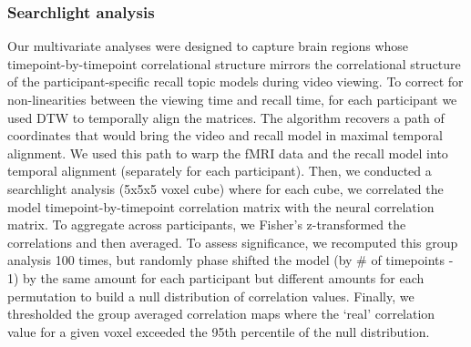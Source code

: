 \documentclass{article}
\begin{document}
{ \subsubsection{Searchlight analysis}
 Our multivariate analyses were designed to capture brain regions whose timepoint-by-timepoint correlational structure mirrors the correlational structure of the participant-specific recall topic models during video viewing. To correct for non-linearities between the viewing time and recall time, for each participant we used DTW to temporally align the matrices. The algorithm recovers a path of coordinates that would bring the video and recall model in maximal temporal alignment. We used this path to warp the fMRI data and the recall model into temporal alignment (separately for each participant). Then, we conducted a searchlight analysis (5x5x5 voxel cube) where for each cube, we correlated the model timepoint-by-timepoint correlation matrix with the neural correlation matrix. To aggregate across participants, we Fisher's z-transformed the correlations and then averaged.  To assess significance, we recomputed this group analysis 100 times, but randomly phase shifted the model (by \# of timepoints - 1) by the same amount for each participant but different amounts for each permutation to build a null distribution of correlation values. Finally, we thresholded the group averaged correlation maps where the `real' correlation value for a given voxel exceeded the 95th percentile of the null distribution.




}
\end{document}
